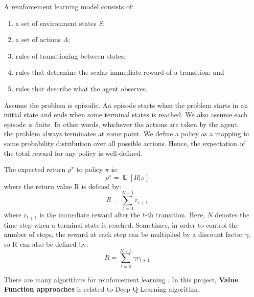 \documentclass[a4paper]{article}
\DeclareMathOperator{\E}{\mathbb{E}}
\begin{document}
            A reinforcement learning model consists of: \cite{intro-rl}
            \begin{enumerate}[leftmargin=1.5cm]
                \item a set of environment states $S$;
                \item a set of actions $A$;
                \item rules of transitioning between states;
                \item rules that determine the scalar immediate reward
                of a transition; and
                \item rules that describe what the agent observes.
            \end{enumerate}
            
            
            Assume the problem is episodic. An episode starts when the
            problem starts in an initial state and ends when some terminal
            states is reached. We also assume each episode is finite. In
            other words, whichever the actions are taken by the agent, 
            the problem always terminates at some point. We define a policy
            as a mapping to some probability distribution over all possible
            actions. Hence, the expectation of the total reward for any
            policy is well-defined.
            
            The expected return $\rho^\pi$ to policy $\pi$ is:
            \begin{equation*}
                \rho^\pi = \E [R|\pi]
            \end{equation*}
            where the return value R is defined by:
            \begin{equation*}
                R=\sum_{t=0}^{N-1} r_{t+1}
            \end{equation*}
            where $r_{t+1}$ is the immediate reward after the $t$-th transition. Here, $N$ denotes the time step when a terminal state is reached. \cite{intro-rl} Sometimes, in order to control the number of steps, the reward at each step can be multiplied by a discount factor $\gamma$, so R can also be defined by:
            \begin{equation*}
                R=\sum_{t=0}^{N-1} \gamma r_{t+1}
            \end{equation*}
            
            There are many algorithms for reinforcement learning \cite{intro-rl}. In this project, \textbf{Value Function approaches} is related to Deep Q-Learning algorithm.
            
\end{document}
